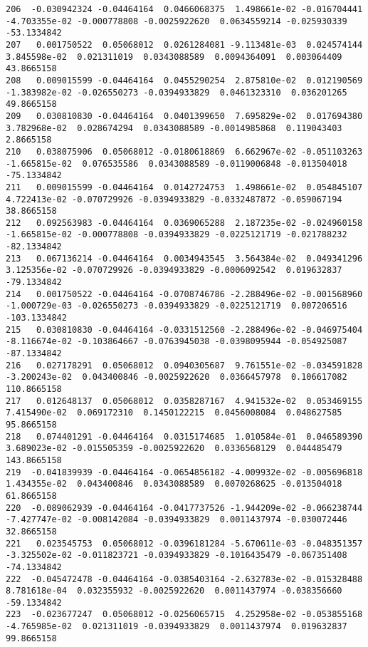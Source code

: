 \documentclass[15pt,a4paper,openright]{article}
\begin{document}
\begin{lstlisting}[language=AMPL, caption = data file]
206  -0.030942324 -0.04464164  0.0466068375  1.498661e-02 -0.016704441 -4.703355e-02 -0.000778808 -0.0025922620  0.0634559214 -0.025930339  -53.1334842
207   0.001750522  0.05068012  0.0261284081 -9.113481e-03  0.024574144  3.845598e-02  0.021311019  0.0343088589  0.0094364091  0.003064409   43.8665158
208   0.009015599 -0.04464164  0.0455290254  2.875810e-02  0.012190569 -1.383982e-02 -0.026550273 -0.0394933829  0.0461323310  0.036201265   49.8665158
209   0.030810830 -0.04464164  0.0401399650  7.695829e-02  0.017694380  3.782968e-02  0.028674294  0.0343088589 -0.0014985868  0.119043403    2.8665158
210   0.038075906  0.05068012 -0.0180618869  6.662967e-02 -0.051103263 -1.665815e-02  0.076535586  0.0343088589 -0.0119006848 -0.013504018  -75.1334842
211   0.009015599 -0.04464164  0.0142724753  1.498661e-02  0.054845107  4.722413e-02 -0.070729926 -0.0394933829 -0.0332487872 -0.059067194   38.8665158
212   0.092563983 -0.04464164  0.0369065288  2.187235e-02 -0.024960158 -1.665815e-02 -0.000778808 -0.0394933829 -0.0225121719 -0.021788232  -82.1334842
213   0.067136214 -0.04464164  0.0034943545  3.564384e-02  0.049341296  3.125356e-02 -0.070729926 -0.0394933829 -0.0006092542  0.019632837  -79.1334842
214   0.001750522 -0.04464164 -0.0708746786 -2.288496e-02 -0.001568960 -1.000729e-03 -0.026550273 -0.0394933829 -0.0225121719  0.007206516 -103.1334842
215   0.030810830 -0.04464164 -0.0331512560 -2.288496e-02 -0.046975404 -8.116674e-02 -0.103864667 -0.0763945038 -0.0398095944 -0.054925087  -87.1334842
216   0.027178291  0.05068012  0.0940305687  9.761551e-02 -0.034591828 -3.200243e-02  0.043400846 -0.0025922620  0.0366457978  0.106617082  110.8665158
217   0.012648137  0.05068012  0.0358287167  4.941532e-02  0.053469155  7.415490e-02  0.069172310  0.1450122215  0.0456008084  0.048627585   95.8665158
218   0.074401291 -0.04464164  0.0315174685  1.010584e-01  0.046589390  3.689023e-02 -0.015505359 -0.0025922620  0.0336568129  0.044485479  143.8665158
219  -0.041839939 -0.04464164 -0.0654856182 -4.009932e-02 -0.005696818  1.434355e-02  0.043400846  0.0343088589  0.0070268625 -0.013504018   61.8665158
220  -0.089062939 -0.04464164 -0.0417737526 -1.944209e-02 -0.066238744 -7.427747e-02 -0.008142084 -0.0394933829  0.0011437974 -0.030072446   32.8665158
221   0.023545753  0.05068012 -0.0396181284 -5.670611e-03 -0.048351357 -3.325502e-02 -0.011823721 -0.0394933829 -0.1016435479 -0.067351408  -74.1334842
222  -0.045472478 -0.04464164 -0.0385403164 -2.632783e-02 -0.015328488  8.781618e-04  0.032355932 -0.0025922620  0.0011437974 -0.038356660  -59.1334842
223  -0.023677247  0.05068012 -0.0256065715  4.252958e-02 -0.053855168 -4.765985e-02  0.021311019 -0.0394933829  0.0011437974  0.019632837   99.8665158

\end{lstlisting}
\end{document}
